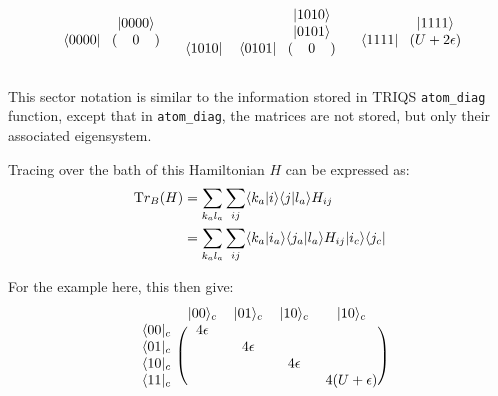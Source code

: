 \documentclass[10pt,letter]{article}
\begin{document}
\begin{align}
\begin{blockarray}{cc}
& \ket{0000} \\
\begin{block}{c(c)}
\bra{0000} & 0\\
\end{block}
\end{blockarray}
&&
\begin{blockarray}{ccc}
& & \ket{1010} \\
& & \ket{0101} \\
\begin{block}{cc(c)}
\bra{1010} & \bra{0101} & 0\\
\end{block}
\end{blockarray}
&&
\begin{blockarray}{cc}
& \ket{1111} \\
\begin{block}{c(c)}
\bra{1111} & U + 2\epsilon \\
\end{block}
\end{blockarray}
\end{align}

This sector notation is similar to the information stored in TRIQS \Verb#atom_diag# function, except that in \Verb#atom_diag#, the matrices are not stored, but only their associated eigensystem.

Tracing over the bath of this Hamiltonian $H$ can be expressed as:
\begin{align}
\text Tr_B (H)
&= \sum_{k_a l_a} \sum_{ij} \langle k_a \vert i \rangle \langle j \vert l_a \rangle H_{ij}
\\
&= \sum_{k_a l_a} \sum_{ij} \langle k_a \vert i_a \rangle\langle j_a \vert l_a \rangle    H_{ij} \vert i_c \rangle \langle j_c \vert  
\end{align}

For the example here, this then give:
\begin{align}
\begin{blockarray}{ccccc}
& \ket{00}_c & \ket{01}_c & \ket{10}_c & \ket{10}_c \\
\begin{block}{c(cccc)}
\bra{00}_c & 4\epsilon &  &  & \\
\bra{01}_c &  & 4\epsilon &  & \\ 
\bra{10}_c &  &  & 4\epsilon & \\ 
\bra{11}_c &  &  &  & 4(U+\epsilon) \\ 
\end{block}
\end{blockarray}
\end{align}
\end{document}
